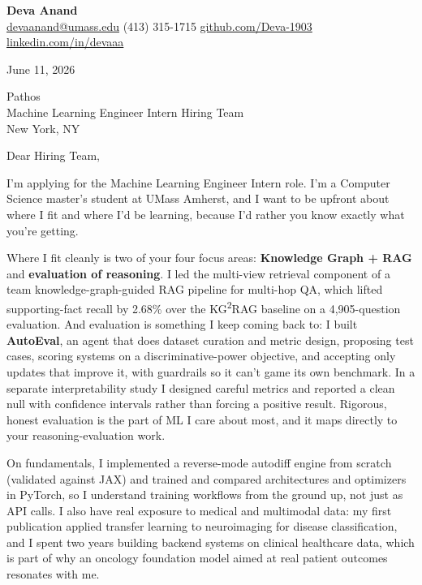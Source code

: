 \documentclass[letterpaper,11pt]{article}
\begin{document}
\begin{center}
  {\LARGE \bfseries \textcolor{ResumeNavy}{Deva Anand}} \\[3pt]
  {\small
  \href{mailto:devaanand@umass.edu}{devaanand@umass.edu} \enspace\textbar\enspace
  (413) 315-1715 \enspace\textbar\enspace
  \href{https://github.com/Deva-1903}{github.com/Deva-1903} \enspace\textbar\enspace
  \href{https://linkedin.com/in/devaaa/}{linkedin.com/in/devaaa}}
\end{center}
\vspace{6pt}

June 11, 2026

\vspace{2pt}
Pathos \\
Machine Learning Engineer Intern Hiring Team \\
New York, NY

\vspace{6pt}
Dear Hiring Team,

I'm applying for the Machine Learning Engineer Intern role. I'm a Computer Science master's student at UMass Amherst, and I want to be upfront about where I fit and where I'd be learning, because I'd rather you know exactly what you're getting.

Where I fit cleanly is two of your four focus areas: \textbf{Knowledge Graph + RAG} and \textbf{evaluation of reasoning}. I led the multi-view retrieval component of a team knowledge-graph-guided RAG pipeline for multi-hop QA, which lifted supporting-fact recall by 2.68\% over the KG\textsuperscript{2}RAG baseline on a 4,905-question evaluation. And evaluation is something I keep coming back to: I built \textbf{AutoEval}, an agent that does dataset curation and metric design, proposing test cases, scoring systems on a discriminative-power objective, and accepting only updates that improve it, with guardrails so it can't game its own benchmark. In a separate interpretability study I designed careful metrics and reported a clean null with confidence intervals rather than forcing a positive result. Rigorous, honest evaluation is the part of ML I care about most, and it maps directly to your reasoning-evaluation work.

On fundamentals, I implemented a reverse-mode autodiff engine from scratch (validated against JAX) and trained and compared architectures and optimizers in PyTorch, so I understand training workflows from the ground up, not just as API calls. I also have real exposure to medical and multimodal data: my first publication applied transfer learning to neuroimaging for disease classification, and I spent two years building backend systems on clinical healthcare data, which is part of why an oncology foundation model aimed at real patient outcomes resonates with me.
\end{document}
